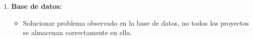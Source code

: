 \documentclass[a4paper,12pt]{letter}
\begin{document}
\begin{letter}
\begin{enumerate}
    \item {\textbf {Base de datos:}}
        \begin{itemize}
            \item {Solucionar problema observado en la base de datos, no todos los proyectos se almacenan correctamente en ella.}
        \end{itemize}
\end{enumerate}

\end{letter}
\end{document}

